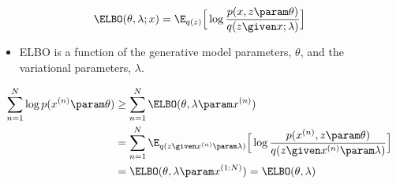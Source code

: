 
\begin{frame}
    \[ \ELBO(\theta, \lambda; x) = \E_{q(z)}\Big[\log \frac{p(x, z \param \theta)}{q(z\given x;\lambda)} \Big]\]
\begin{itemize}
    \item ELBO is a function of the generative model parameters, $\theta$, and the variational parameters, $\lambda$.
\end{itemize}
\begin{align*}
    \sum_{n=1}^N \log p(x^{(n)} \param \theta) &\ge \sum_{n=1}^N \ELBO(\theta, \lambda \param x^{(n)}) \\
    &= \sum_{n=1}^N \E_{q(z \given x^{(n)} \param \lambda)}\Big[\log \frac{p(x^{(n)}, z \param \theta)}{q(z \given x^{(n)} \param \lambda)} \Big] \\
    &= \ELBO(\theta, \lambda \param x^{(1:N)}) = \ELBO(\theta, \lambda)
\end{align*} 
\end{frame}





